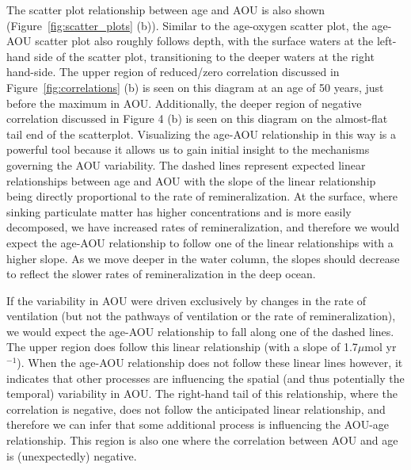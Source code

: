 The scatter plot relationship between age and AOU is also shown
(Figure~\ref{fig:scatter_plots} (b)).  Similar to the age-oxygen scatter plot,
the age-AOU scatter plot also roughly follows depth, with the surface waters at
the left-hand side of the scatter plot, transitioning to the deeper waters at
the right hand-side. The upper region of reduced/zero correlation discussed in
Figure~\ref{fig:correlations} (b) is seen on this diagram at an age of 50 years,
just before the maximum in AOU. Additionally, the deeper region of negative
correlation discussed in Figure 4 (b) is seen on this diagram on the almost-flat
tail end of the scatterplot. Visualizing the age-AOU relationship in this way is
a powerful tool because it allows us to gain initial insight to the mechanisms
governing the AOU variability. The dashed lines represent expected linear
relationships between age and AOU with the slope of the linear relationship being
directly proportional to the rate of remineralization. At the surface, where
sinking particulate matter has higher concentrations and is more easily decomposed,
we have increased rates of remineralization, and therefore we would expect the
age-AOU relationship to follow one of the linear relationships with a higher slope.
As we move deeper in the water column, the slopes should decrease to reflect the
slower rates of remineralization in the deep ocean.

If the variability in AOU were driven exclusively by changes in the rate of
ventilation (but not the pathways of ventilation or the rate of remineralization),
we would expect the age-AOU relationship to fall along one of the dashed lines.
The upper region does follow this linear relationship (with a slope of
1.7$\mu$mol yr$^{-1}$). When the age-AOU relationship does not follow these linear
lines however, it indicates that other processes are influencing the spatial
(and thus potentially the temporal) variability in AOU. The right-hand tail of
this relationship, where the correlation is negative, does not follow the
anticipated linear relationship, and therefore we can infer that some additional
process is influencing the AOU-age relationship. This region is also one where
the correlation between AOU and age is (unexpectedly) negative.

